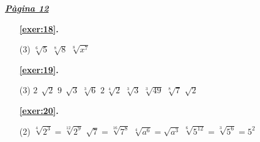 
 \vspace{1cm} 
 

\vspace{0.3cm}


\hyperlink{page.12}{\textbf{\em Pàgina 12}}
\begin{enumerate}



 \item[\fontfamily{phv}\selectfont\color{blue}\textbf{\ref{exer:18}. }] \label{ans:18}
 \begin{tasks}[column-sep=1em, item-indent=1.3333em](3)
	 \task $\sqrt [{6}]{5} $
	 \task $\sqrt [{8}]{8} $
	 \task $\sqrt [{8}]{x^{7} } $
\end{tasks}
 \end{enumerate}
\begin{enumerate}



 \item[\fontfamily{phv}\selectfont\color{blue}\textbf{\ref{exer:19}. }] \label{ans:19}
 \begin{tasks}[column-sep=1em, item-indent=1.3333em](3)
	 \task $2\,\sqrt [{}]{2} $
	 \task $9\,\sqrt [{}]{3} $
	 \task $\sqrt [{3}]{6} $
	 \task $2\,\sqrt [{4}]{2} $
	 \task $\sqrt [{3}]{3} $
	 \task $\sqrt [{3}]{49} $
	 \task $\sqrt [{8}]{7} $
	 \task $\sqrt {2} $
\end{tasks}



 \item[\fontfamily{phv}\selectfont\color{blue}\textbf{\ref{exer:20}. }] \label{ans:20}
 \begin{tasks}[column-sep=1em, item-indent=1.3333em](2)
	 \task* $\sqrt [{4}]{2^{3} } =\sqrt [{12}]{2^{9} } $
	 \task* $\sqrt {7} =\sqrt [{16}]{7^{8} } $
	 \task* $\sqrt [{4}]{a^{6} } =\sqrt {a^{3} } $
	 \task* $\sqrt [{6}]{5^{12} } =\sqrt [{3}]{5^{6} } =5^{2} $
\end{tasks}
 \end{enumerate}
\vspace{0.3cm}


